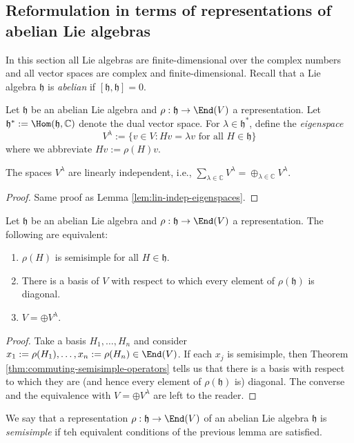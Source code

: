 \documentclass[reqno]{amsart} 
\begin{document}
\subsection{Reformulation in terms of representations of abelian Lie algebras}
\label{sec:org67e3030}
In this section all Lie algebras are finite-dimensional over the complex numbers and all vector spaces are complex and finite-dimensional.  Recall that a Lie algebra $\mathfrak{h}$ is \emph{abelian} if $[\mathfrak{h},\mathfrak{h}] = 0$.

Let $\mathfrak{h}$ be an abelian Lie algebra and $\rho : \mathfrak{h} \rightarrow \End(V)$ a representation.  Let $\mathfrak{h}^* := \Hom(\mathfrak{h},\mathbb{C})$ denote the dual vector space.  For $\lambda \in \mathfrak{h}^*$, define the \emph{eigenspace}
\begin{equation*}
  V^\lambda := \{v \in V : H v = \lambda v \text{ for all }H \in \mathfrak{h} \}
\end{equation*}
where we abbreviate $H v := \rho(H) v$.
\begin{lemma}
  The spaces $V^\lambda$ are linearly independent, i.e., $\sum_{\lambda \in \mathbb{C}} V^\lambda = \oplus_{\lambda \in \mathbb{C}} V^\lambda$.
\end{lemma}
\begin{proof}
  Same proof as Lemma \ref{lem:lin-indep-eigenspaces}.
\end{proof}

\begin{lemma}
  Let $\mathfrak{h}$ be an abelian Lie algebra and $\rho : \mathfrak{h} \rightarrow \End(V)$ a representation.  The following are equivalent:
  \begin{enumerate}
  \item $\rho(H)$ is semisimple for all $H \in \mathfrak{h}$.
  \item There is a basis of $V$ with respect to which every element of $\rho(\mathfrak{h})$ is diagonal.
  \item $V = \oplus V^\lambda$.
  \end{enumerate}
\end{lemma}
\begin{proof}
  Take a basis $H_1,\dotsc,H_n$ and consider $x_1 := \rho(H_1), \dotsc, x_n := \rho(H_n) \in \End(V)$.  If each $x_j$ is semisimple, then Theorem \ref{thm:commuting-semisimple-operators} tells us that there is a basis with respect to which they are (and hence every element of $\rho(\mathfrak{h})$ is) diagonal.  The converse and the equivalence with $V = \oplus V^\lambda$ are left to the reader.
\end{proof}
\begin{definition}
  We say that a representation $\rho : \mathfrak{h} \rightarrow \End(V)$ of an abelian Lie algebra $\mathfrak{h}$ is \emph{semisimple} if teh equivalent conditions of the previous lemma are satisfied.
\end{definition}
\end{document}
